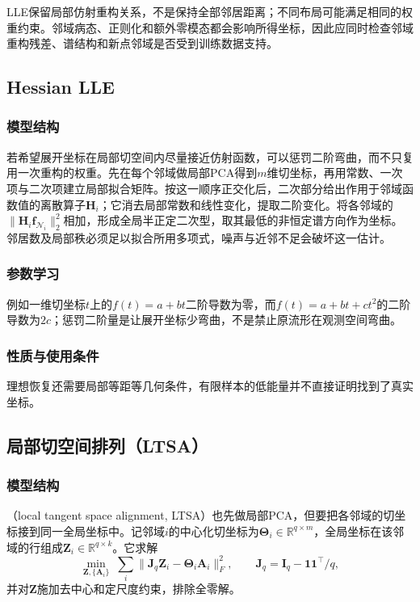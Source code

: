 LLE保留局部仿射重构关系，不是保持全部邻居距离；不同布局可能满足相同的权重约束。邻域病态、正则化和额外零模态都会影响所得坐标，因此应同时检查邻域重构残差、谱结构和新点邻域是否受到训练数据支持。

\subsection{Hessian LLE}

\subsubsection{模型结构}

若希望展开坐标在局部切空间内尽量接近仿射函数，可以惩罚二阶弯曲，而不只复用一次重构的权重。先在每个邻域做局部PCA得到$m$维切坐标，再用常数、一次项与二次项建立局部拟合矩阵。按这一顺序正交化后，二次部分给出作用于邻域函数值的离散算子$\bm H_i$；它消去局部常数和线性变化，提取二阶变化。将各邻域的$\lVert\bm H_i\bm f_{\mathcal N_i}\rVert_2^2$相加，形成全局半正定二次型，取其最低的非恒定谱方向作为坐标。邻居数及局部秩必须足以拟合所用多项式，噪声与近邻不足会破坏这一估计。

\subsubsection{参数学习}

例如一维切坐标$t$上的$f(t)=a+bt$二阶导数为零，而$f(t)=a+bt+ct^2$的二阶导数为$2c$；惩罚二阶量是让展开坐标少弯曲，不是禁止原流形在观测空间弯曲。

\subsubsection{性质与使用条件}

理想恢复还需要局部等距等几何条件，有限样本的低能量并不直接证明找到了真实坐标。

\subsection{局部切空间排列（LTSA）}

\subsubsection{模型结构}

（local tangent space alignment, LTSA）也先做局部PCA，但要把各邻域的切坐标接到同一全局坐标中。记邻域$i$的中心化切坐标为$\bm\Theta_i\in\mathbb R^{q\times m}$，全局坐标在该邻域的行组成$\bm Z_i\in\mathbb R^{q\times k}$。它求解
\[
 \min_{\bm Z,\{\bm A_i\}}\;
 \sum_i\lVert\bm J_q\bm Z_i-\bm\Theta_i\bm A_i\rVert_F^2,
 \qquad \bm J_q=\bm I_q-\bm1\bm1^\top/q,
\]
并对$\bm Z$施加去中心和定尺度约束，排除全零解。

